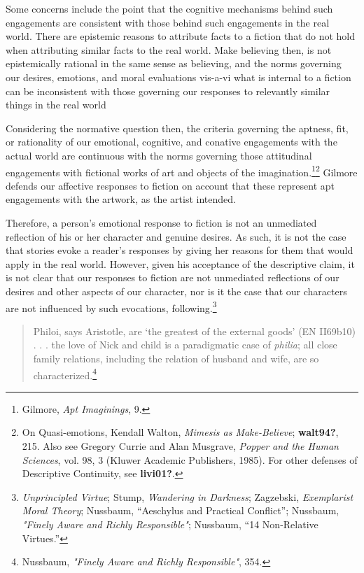 \documentclass[
  12pt,
]{book}
\theoremstyle{definition}
\theoremstyle{definition}
\theoremstyle{definition}
\theoremstyle{definition}
\theoremstyle{remark}
\begin{document}
Some concerns include the point that the cognitive mechanisms behind such engagements are consistent with those behind such engagements in the real world. There are epistemic reasons to attribute facts to a fiction that do not hold when attributing similar facts to the real world. Make believing then, is not epistemically rational in the same sense as believing, and the norms governing our desires, emotions, and moral evaluations vis-a-vi what is internal to a fiction can be inconsistent with those governing our responses to relevantly similar things in the real world

Considering the normative question then, the criteria governing the aptness, fit, or rationality of our emotional, cognitive, and conative engagements with the actual world are continuous with the norms governing those attitudinal engagements with fictional works of art and objects of the imagination.\footnote{Gilmore, \emph{Apt {Imaginings}}, 9.}\footnote{On Quasi-emotions, Kendall Walton, \emph{Mimesis as {Make-Believe}}; \textbf{walt94?}, 215. Also see Gregory Currie and Alan Musgrave, \emph{Popper and the Human Sciences}, vol. 98, 3 (Kluwer Academic Publishers, 1985). For other defenses of Descriptive Continuity, see \textbf{livi01?}.} Gilmore defends our affective responses to fiction on account that these represent apt engagements with the artwork, as the artist intended.

Therefore, a person's emotional response to fiction is not an unmediated reflection of his or her character and genuine desires. As such, it is not the case that stories evoke a reader's responses by giving her reasons for them that would apply in the real world. However, given his acceptance of the descriptive claim, it is not clear that our responses to fiction are not unmediated reflections of our desires and other aspects of our character, nor is it the case that our characters are not influenced by such evocations, following.\footnote{\emph{Unprincipled {Virtue}}; Stump, \emph{Wandering in {Darkness}}; Zagzebski, \emph{Exemplarist {Moral Theory}}; Nussbaum, {``Aeschylus and Practical Conflict''}; Nussbaum, \emph{"{Finely Aware} and {Richly Responsible}"}; Nussbaum, {``14 {Non-Relative Virtues}.''}}

\begin{quote}
Philoi, says Aristotle, are `the greatest of the external goods' (EN II69b10) . . . the love of Nick and child is a paradigmatic case of \emph{philia}; all close family relations, including the relation of husband and wife, are so characterized.\footnote{Nussbaum, \emph{"{Finely Aware} and {Richly Responsible}"}, 354.}
\end{quote}
\end{document}
